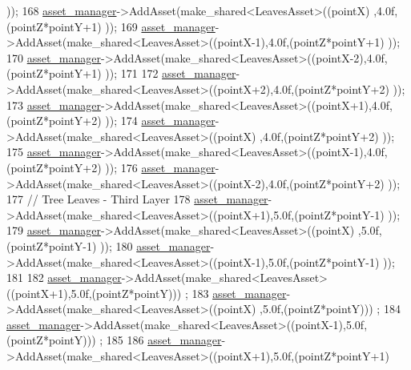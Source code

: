 \begin{DoxyCode}
      ));
168             \hyperlink{classGameWorld_aec5c0bca4fb5a41e4aac2dce2871266d}{asset\_manager}->AddAsset(make\_shared<LeavesAsset>((pointX)  ,4.0f,(pointZ*pointY+1)
      ));
169             \hyperlink{classGameWorld_aec5c0bca4fb5a41e4aac2dce2871266d}{asset\_manager}->AddAsset(make\_shared<LeavesAsset>((pointX-1),4.0f,(pointZ*pointY+1)
      ));
170             \hyperlink{classGameWorld_aec5c0bca4fb5a41e4aac2dce2871266d}{asset\_manager}->AddAsset(make\_shared<LeavesAsset>((pointX-2),4.0f,(pointZ*pointY+1)
      ));
171 
172             \hyperlink{classGameWorld_aec5c0bca4fb5a41e4aac2dce2871266d}{asset\_manager}->AddAsset(make\_shared<LeavesAsset>((pointX+2),4.0f,(pointZ*pointY+2)
      ));
173             \hyperlink{classGameWorld_aec5c0bca4fb5a41e4aac2dce2871266d}{asset\_manager}->AddAsset(make\_shared<LeavesAsset>((pointX+1),4.0f,(pointZ*pointY+2)
      ));
174             \hyperlink{classGameWorld_aec5c0bca4fb5a41e4aac2dce2871266d}{asset\_manager}->AddAsset(make\_shared<LeavesAsset>((pointX)  ,4.0f,(pointZ*pointY+2)
      ));
175             \hyperlink{classGameWorld_aec5c0bca4fb5a41e4aac2dce2871266d}{asset\_manager}->AddAsset(make\_shared<LeavesAsset>((pointX-1),4.0f,(pointZ*pointY+2)
      ));
176             \hyperlink{classGameWorld_aec5c0bca4fb5a41e4aac2dce2871266d}{asset\_manager}->AddAsset(make\_shared<LeavesAsset>((pointX-2),4.0f,(pointZ*pointY+2)
      ));
177             \textcolor{comment}{// Tree Leaves - Third Layer}
178             \hyperlink{classGameWorld_aec5c0bca4fb5a41e4aac2dce2871266d}{asset\_manager}->AddAsset(make\_shared<LeavesAsset>((pointX+1),5.0f,(pointZ*pointY-1)
      ));
179             \hyperlink{classGameWorld_aec5c0bca4fb5a41e4aac2dce2871266d}{asset\_manager}->AddAsset(make\_shared<LeavesAsset>((pointX)  ,5.0f,(pointZ*pointY-1)
      ));
180             \hyperlink{classGameWorld_aec5c0bca4fb5a41e4aac2dce2871266d}{asset\_manager}->AddAsset(make\_shared<LeavesAsset>((pointX-1),5.0f,(pointZ*pointY-1)
      )); 
181 
182             \hyperlink{classGameWorld_aec5c0bca4fb5a41e4aac2dce2871266d}{asset\_manager}->AddAsset(make\_shared<LeavesAsset>((pointX+1),5.0f,(pointZ*pointY)))
      ;
183             \hyperlink{classGameWorld_aec5c0bca4fb5a41e4aac2dce2871266d}{asset\_manager}->AddAsset(make\_shared<LeavesAsset>((pointX)  ,5.0f,(pointZ*pointY)))
      ;
184             \hyperlink{classGameWorld_aec5c0bca4fb5a41e4aac2dce2871266d}{asset\_manager}->AddAsset(make\_shared<LeavesAsset>((pointX-1),5.0f,(pointZ*pointY)))
      ;
185  
186             \hyperlink{classGameWorld_aec5c0bca4fb5a41e4aac2dce2871266d}{asset\_manager}->AddAsset(make\_shared<LeavesAsset>((pointX+1),5.0f,(pointZ*pointY+1)

\end{DoxyCode}
